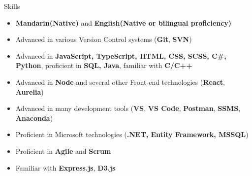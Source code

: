 \documentclass{resume}
\begin{document}
\begin{rSection}{Skills}

\begin{itemize}

    \item   \textbf{Mandarin(Native)} and \textbf{English(Native or bilingual proficiency)}
    \item   Advanced in various Version Control systems (\textbf{Git}, \textbf{SVN})
    \item	Advanced in \textbf{JavaScript, TypeScript, HTML, CSS, SCSS, C\#, Python}, proficient in \textbf{SQL, Java}, familiar with \textbf{C/C++}
    \item	Advanced in \textbf{Node} and several other Front-end technologies (\textbf{React}, \textbf{Aurelia})
    \item   Advanced in many development tools (\textbf{VS}, \textbf{VS Code}, \textbf{Postman}, \textbf{SSMS}, \textbf{Anaconda}) 
    \item   Proficient in Microsoft technologies (\textbf{.NET, Entity Framework, MSSQL})
    \item   Proficient in \textbf{Agile} and \textbf{Scrum}
    \item   Familiar with \textbf{Express.js}, \textbf{D3.js}

\end{itemize}

\end{rSection}
\end{document}
